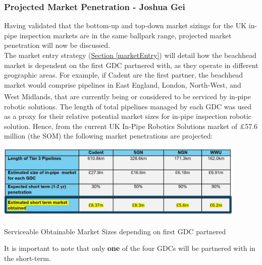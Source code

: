 \documentclass[11pt]{article}		%
\newcommand{\supercite}[1]{\textsuperscript{\cite{#1}}}		%
\newcommand{\sectref}[1]{\hyperref[#1]{Section \ref*{#1}}}     %
\begin{document}
    \subsubsection[Projected Market Penetration]{Projected Market Penetration - Joshua Gei}\label{marketPenSect}
    
    Having validated that the bottom-up and top-down market sizings for the UK in-pipe inspection markets are in the same ballpark range, projected market penetration will now be discussed.
    \\
     \hspace*{2ex}The market entry strategy (\sectref{marketEntry}) will detail how the beachhead market is dependent on the first GDC partnered with, as they operate in different geographic areas. For example, if Cadent are the first partner, the beachhead market would comprise pipelines in East England, London, North-West, and West Midlands\supercite{cadentarea}, that are currently being or considered to be serviced by in-pipe robotic solutions.
        \hspace*{2ex}The length of total pipelines managed by each GDC was used as a proxy for their relative potential market sizes for in-pipe inspection robotic solution. Hence, from the current UK In-Pipe Robotics Solutions market of £57.6 million (the SOM) the following market penetrations are projected: 
        
		\begin{table}[h]
			\centering
			\includegraphics[width=0.9\textwidth]{SOM.jpg}
			\caption{Serviceable Obtainable Market Sizes depending on first GDC partnered\supercite{ltd}}
			\label{SOM}
 		\end{table}
    
    It is important to note that only \textbf{one} of the four GDCs will be partnered with in the short-term.
    
\end{document}
